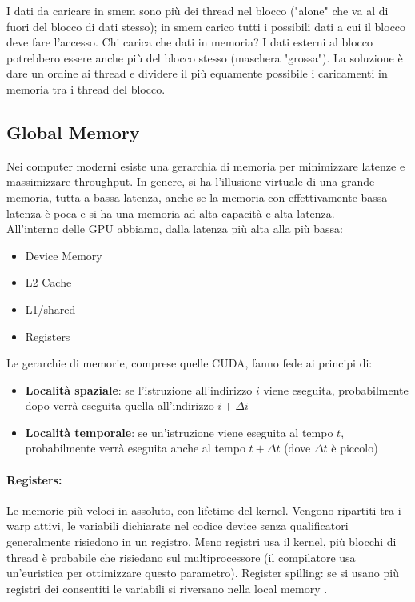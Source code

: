 I dati da caricare in smem sono più dei thread nel blocco ("alone" che va al di fuori del blocco di dati stesso); in smem carico tutti i possibili dati a cui il blocco deve fare l'accesso. Chi carica che dati in memoria? I dati esterni al blocco potrebbero essere anche più del blocco stesso (maschera "grossa"). La soluzione è dare un ordine ai thread e dividere il più equamente possibile i caricamenti in memoria tra i thread del blocco.\\


\newpage

\subsection{Global Memory}

Nei computer moderni esiste una gerarchia di memoria per minimizzare latenze e massimizzare throughput. In genere, si ha l'illusione virtuale di una grande memoria, tutta a bassa latenza, anche se la memoria con effettivamente bassa latenza è poca e si ha una memoria ad alta capacità e alta latenza.\\

All'interno delle GPU abbiamo, dalla latenza più alta alla più bassa: 
\begin{itemize}
	\item Device Memory
	\item L2 Cache
	\item L1/shared
	\item Registers
\end{itemize}

Le gerarchie di memorie, comprese quelle CUDA, fanno fede ai principi di: 
\begin{itemize}
	\item \textbf{Località spaziale}: se l'istruzione all'indirizzo $i$ viene eseguita, probabilmente dopo verrà eseguita quella all'indirizzo $i+\Delta i$
	\item \textbf{Località temporale}: se un'istruzione viene eseguita al tempo $t$, probabilmente verrà eseguita anche al tempo $t + \Delta t$ (dove $\Delta t$ è piccolo)
\end{itemize}

\paragraph{Registers:} Le memorie più veloci in assoluto, con lifetime del kernel. Vengono ripartiti tra i warp attivi, le variabili dichiarate nel codice device senza qualificatori generalmente risiedono in un registro. Meno registri usa il kernel, più blocchi di thread è probabile che risiedano sul multiprocessore (il compilatore usa un'euristica per ottimizzare questo parametro). Register spilling: se si usano più registri dei consentiti le variabili si riversano nella local memory .\\

